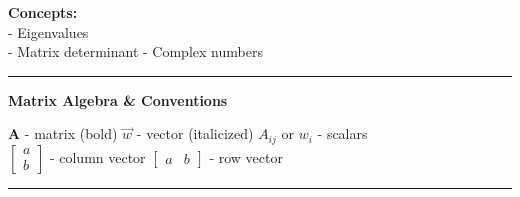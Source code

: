 \documentclass{article}
\newcommand{\ind}{\-\hspace{1cm}}
\begin{document}
\noindent{}

\textbf{Concepts:}\\
\ind - Eigenvalues\\
\ind - Matrix determinant
\ind - Complex numbers\\

\rule[0.5ex]{\linewidth}{1pt}

\textbf{Matrix Algebra \& Conventions}
\begin{center}
\textbf{A} - matrix (bold) \ind \ind $\vec w$ - vector (italicized) \ind \ind $A_{ij}$ or $w_i$ - scalars\\
$\begin{bmatrix} a\\ b \end{bmatrix}$ - column vector \ind \ind $\begin{bmatrix} a & b \end{bmatrix}$ - row vector
\end{center}

\rule[0.5ex]{\linewidth}{1pt}
\end{document}
